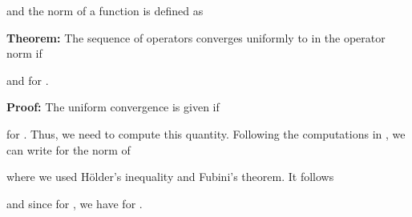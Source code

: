 \documentclass[twoside,11pt]{article}
\begin{document}
and the norm of a function  is defined as


\textbf{Theorem:}
The sequence of operators  converges uniformly to 
in the operator norm if

and  for .

\textbf{Proof:}
The uniform convergence is given if

for .
Thus, we need to compute this quantity.
Following the computations in \cite{werner},
we can write for the norm of 

where we used H\"older's inequality and Fubini's theorem.
It follows

and since  for ,
we have 
for .




\end{document}
